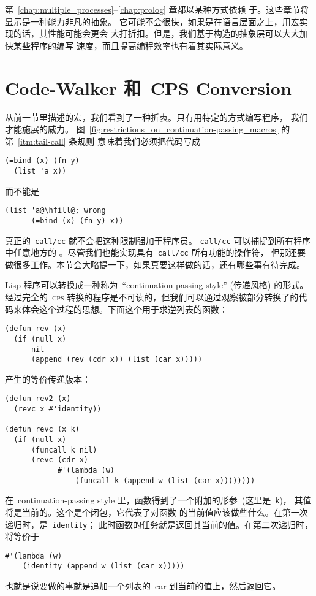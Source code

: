第~\ref{chap:multiple_processes}--\ref{chap:prolog} 章都以某种方式依赖
于\continuation{}。这些章节将显示\continuation{}是一种能力非凡的抽象。
它可能不会很快，如果是在语言层面之上，用宏实现的话，其性能可能会更会
大打折扣。但是，我们基于\continuation{}构造的抽象层可以大大加快某些程序的编写
速度，而且提高编程效率也有着其实际意义。

\section{Code-Walker 和~CPS Conversion}
\label{sec:code-walkers_and_cps_conversion}

从前一节里描述的宏，我们看到了一种折衷。只有用特定的方式编写程序，
我们才能施展\continuation{}的威力。
图~\ref{fig:restrictions_on_continuation-passing_macros} 的第~\ref{itm:tail-call} 条规则
意味着我们必须把代码写成
\begin{lstlisting}
(=bind (x) (fn y)
  (list 'a x))
\end{lstlisting}
而不能是
\begin{lstlisting}[escapechar=\@]
(list 'a@\hfill@; wrong
      (=bind (x) (fn y) x))
\end{lstlisting}
真正的~\verb|call/cc| 就不会把这种限制强加于程序员。
\texttt{call/cc} 可以捕捉到所有程序中任意地方的
\continuation{}。尽管我们也能实现具有~\texttt{call/cc} 所有功能的操作符，
但那还要做很多工作。本节会大略提一下，如果真要这样做的话，还有哪些事有待完成。

Lisp 程序可以转换成一种称为~``continuation-passing style'' (\continuation{}传递风格) 的形式。
经过完全的~\textsc{cps} 转换的程序是不可读的，但我们可以通过观察被部分转换了的代码来体会这个过程的思想。下面这个用于求逆列表的函数：
\begin{lstlisting}
(defun rev (x)
  (if (null x)
      nil
      (append (rev (cdr x)) (list (car x)))))
\end{lstlisting}
产生的等价\continuation{}传递版本：
\begin{lstlisting}
(defun rev2 (x)
  (revc x #'identity))

(defun revc (x k)
  (if (null x)
      (funcall k nil)
      (revc (cdr x)
            #'(lambda (w)
                (funcall k (append w (list (car x))))))))
\end{lstlisting}

在~continuation-passing style 里，函数得到了一个附加的形参~(这里是~\texttt{k})，
其值将是当前的\continuation{}。这个\continuation{}是个闭包，它代表了对函数
的当前值应该做些什么。在第一次递归时，\continuation{}是~\texttt{identity}；
此时函数的任务就是返回其当前的值。在第二次递归时，\continuation{}
将等价于
\begin{lstlisting}
#'(lambda (w)
    (identity (append w (list (car x)))))
\end{lstlisting}
也就是说要做的事就是追加一个列表的~car 到当前的值上，然后返回它。

